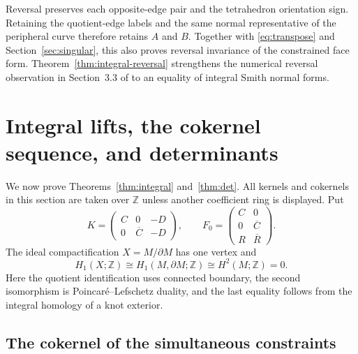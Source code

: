 \documentclass[11pt]{article}
\theoremstyle{definition}\newtheorem{definition}[theorem]{Definition}
\theoremstyle{remark}\newtheorem{remark}[theorem]{Remark}
\newcommand{\R}{\mathbb R}
\newcommand{\Z}{\mathbb Z}
\newcommand{\Ct}{\overline C}
\newcommand{\Rt}{\overline R}
\begin{document}
Reversal preserves each opposite-edge pair and the tetrahedron orientation
sign. Retaining the quotient-edge labels and the same normal representative
of the peripheral curve therefore retains $A$ and $B$. Together with
\eqref{eq:transpose} and Section~\ref{sec:singular}, this also proves
reversal invariance of the constrained face form. Theorem~\ref{thm:integral-reversal}
strengthens the numerical reversal observation in Section~3.3 of
\cite{BGW} to an equality of integral Smith normal forms.

\section{Integral lifts, the cokernel sequence, and determinants}\label{sec:integral}

We now prove Theorems~\ref{thm:integral} and~\ref{thm:det}. All kernels
and cokernels in this section are taken over $\Z$ unless another
coefficient ring is displayed. Put
\[
 K=\begin{pmatrix}C&0&-D\\0&\Ct&-D\end{pmatrix},\qquad
 F_0=\begin{pmatrix}C&0\\0&\Ct\\R&\Rt\end{pmatrix}.
\]
The ideal compactification $X=M/\partial M$ has one vertex and
\[
 H_1(X;\Z)\cong H_1(M,\partial M;\Z)
 \cong H^2(M;\Z)=0.
\]
Here the quotient identification uses connected boundary, the second
isomorphism is Poincar\'e--Lefschetz duality, and the last equality follows
from the integral homology of a knot exterior.

\subsection{The cokernel of the simultaneous constraints}
\end{document}
